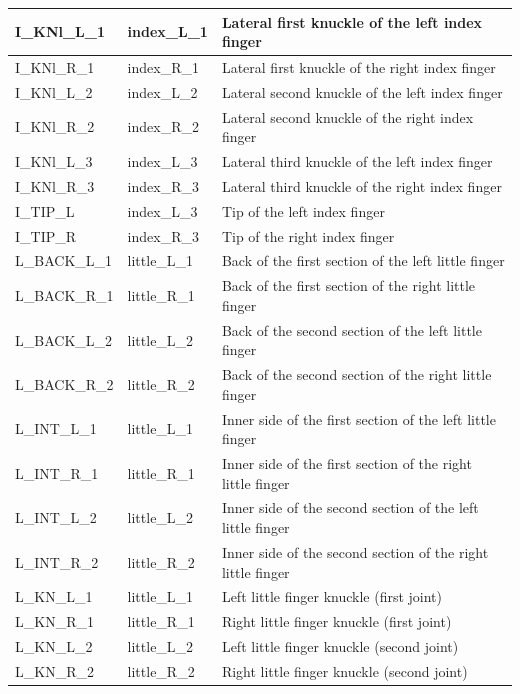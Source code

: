 \documentclass[../main.tex]{subfiles}
\begin{document}
\begin{longtable}{|p{2cm}|p{3cm}|p{5cm}|}
    I\_KNl\_L\_1 & index\_L\_1 & Lateral first knuckle of the left index finger \\ \hline
    I\_KNl\_R\_1 & index\_R\_1 & Lateral first knuckle of the right index finger \\ \hline
    I\_KNl\_L\_2 & index\_L\_2 & Lateral second knuckle of the left index finger \\ \hline
    I\_KNl\_R\_2 & index\_R\_2 & Lateral second knuckle of the right index finger \\ \hline
    I\_KNl\_L\_3 & index\_L\_3 & Lateral third knuckle of the left index finger \\ \hline
    I\_KNl\_R\_3 & index\_R\_3 & Lateral third knuckle of the right index finger \\ \hline
    I\_TIP\_L & index\_L\_3 & Tip of the left index finger \\ \hline
    I\_TIP\_R & index\_R\_3 & Tip of the right index finger \\ \hline
    L\_BACK\_L\_1 & little\_L\_1 & Back of the first section of the left little finger \\ \hline
    L\_BACK\_R\_1 & little\_R\_1 & Back of the first section of the right little finger \\ \hline
    L\_BACK\_L\_2 & little\_L\_2 & Back of the second section of the left little finger \\ \hline
    L\_BACK\_R\_2 & little\_R\_2 & Back of the second section of the right little finger \\ \hline
    L\_INT\_L\_1 & little\_L\_1 & Inner side of the first section of the left little finger \\ \hline
    L\_INT\_R\_1 & little\_R\_1 & Inner side of the first section of the right little finger \\ \hline
    L\_INT\_L\_2 & little\_L\_2 & Inner side of the second section of the left little finger \\ \hline
    L\_INT\_R\_2 & little\_R\_2 & Inner side of the second section of the right little finger \\ \hline
    L\_KN\_L\_1 & little\_L\_1 & Left little finger knuckle (first joint) \\ \hline
    L\_KN\_R\_1 & little\_R\_1 & Right little finger knuckle (first joint) \\ \hline
    L\_KN\_L\_2 & little\_L\_2 & Left little finger knuckle (second joint) \\ \hline
    L\_KN\_R\_2 & little\_R\_2 & Right little finger knuckle (second joint) \\ \hline

\end{longtable}
\end{document}
